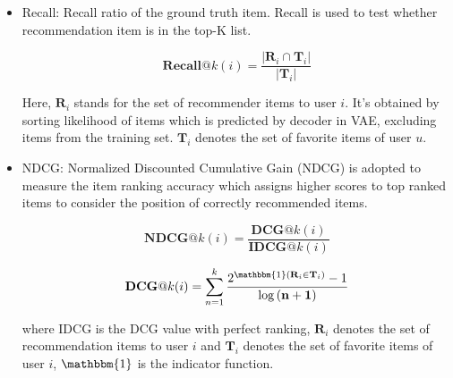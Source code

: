 \begin{itemize}
\item Recall: Recall ratio of the ground truth item. Recall is used to test whether recommendation item is in the top-K list. 

\begin{equation}
\mathbf{Recall}@k(i) = \frac{\lvert \mathbf{R}_i \cap \mathbf{T}_i \rvert }
{\lvert \mathbf{T}_i \rvert}
\label{eq11}
\end{equation}

Here, $\mathbf{R}_i$ stands for the set of recommender items to user $i$. It's obtained by sorting likelihood of items which is predicted by decoder in VAE, excluding items from the training set. $\mathbf{T}_i$ denotes the set of favorite items of user $u$.

\item NDCG: Normalized Discounted Cumulative Gain (NDCG)  is adopted to measure the item ranking accuracy which assigns higher scores to top ranked items to consider the position of correctly recommended items.


\begin{equation}
\mathbf{NDCG} @k\left(i\right) = \frac{ \mathbf{DCG}@k\left(i\right)
 }{\mathbf{IDCG}@k\left(i\right)}
 \label{eq12}
\end{equation}

\begin{equation}
\mathbf{DCG}@k(i) = \sum_{n=1}^k \frac{ 2^{\mathbbm{1} \left( \mathbf{R}_i  \in \mathbf{T}_i\right)}-1}
{\log\left(\mathbf{n+1} \right)}
\label{eq13}
\end{equation}

where IDCG is the DCG value with perfect ranking, $\mathbf{R}_i$ denotes the set of recommendation items to user $i$ and $\mathbf{T}_i$ denotes the set of favorite items of user $i$, $\mathbbm{1}$ is the indicator 
function.
\end{itemize} 





